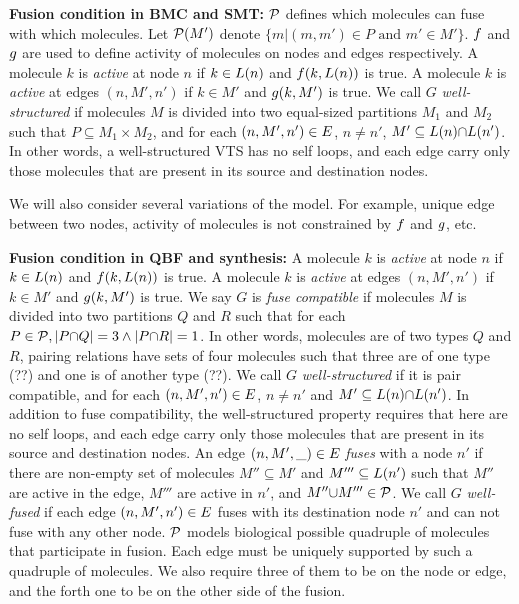 
\textbf{Fusion condition in BMC and SMT:}
$\mathcal{P}$ defines which molecules can fuse with which molecules.
%
Let $\mathcal{P}(M')$ denote $\{m|(m,m') \in P \text{ and } m' \in M'\}$.
%
$f$ and $g$ are used to define activity of molecules on
nodes and edges respectively.
%
A molecule $k$ is {\em active} at node $n$ if $k \in L(n)$ and
$f(k,L(n))$ is true.
%
A molecule $k$ is {\em active} at edges $(n,M',n')$ if $k \in M'$ and
$g(k,M')$ is true.
%
We call $G$ {\em well-structured} if molecules $M$ is divided into
two equal-sized partitions $M_1$ and $M_2$ such that
$P \subseteq M_1 \times M_2$, and
for each $(n,M',n') \in E$, $n \neq n'$, 
$M' \subseteq L(n) {\cap} L(n')$.
%
In other words, a well-structured VTS has no self loops, and 
each edge carry only those molecules that are present in its source
and destination nodes. 

We will also consider several variations of the model.
%
For example, unique edge between two nodes, activity of molecules is
not constrained by $f$ and $g$, etc.
%


\textbf{Fusion condition in QBF and synthesis:}
%
A molecule $k$ is {\em active} at node $n$ if $k \in L(n)$ and
$f(k,L(n))$ is true.
%
A molecule $k$ is {\em active} at edges $(n,M',n')$ if $k \in M'$ and
$g(k,M')$ is true.
%
We say $G$ is {\em fuse compatible} if molecules $M$ is divided into
two partitions $Q$ and $R$ such that
for each $P \in \mathcal{P}, |P {\cap} Q| = 3 \land |P {\cap} R| = 1 $.
%
In other words,
molecules are of two types $Q$ and $R$,
%
pairing relations have sets of four molecules such that three
are of one type (??) and one is of another type (??).
%
%
We call $G$ {\em well-structured} if it is pair compatible, and
for each $(n,M',n') \in E$, $n \neq n'$ and
$M' \subseteq L(n) {\cap} L(n')$.
%
In addition to fuse compatibility, the well-structured property requires that
here are no self loops, and 
each edge carry only those molecules that are present in its source
and destination nodes.
%
An edge $(n,M',\_) \in E$ {\em fuses} with a node $n'$
if there are non-empty set of molecules $M'' \subseteq M'$ and $M''' \subseteq L(n')$
such that $M''$ are active in the edge, $M'''$ are active in $n'$, and $M'' {\cup} M''' \in \mathcal{P}$.
%
We call $G$ {\em well-fused} if each edge $(n,M',n') \in E$ fuses
with its destination node $n'$
and can not fuse with any other node.
%
$\mathcal{P}$ models biological possible quadruple of molecules that participate in fusion.
%
Each edge must be uniquely supported by such a quadruple of molecules.
%
We also require three of them to be on the node or edge, and the forth one
to be on the other side of the fusion.

